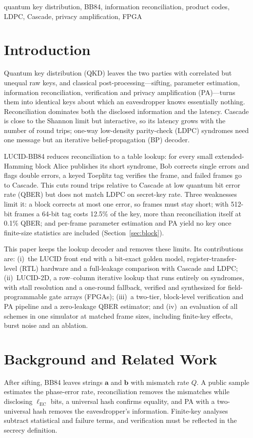 \documentclass[conference]{IEEEtran}
\begin{document}
\begin{IEEEkeywords}
quantum key distribution, BB84, information reconciliation, product codes, LDPC, Cascade, privacy amplification, FPGA
\end{IEEEkeywords}

\section{Introduction}
Quantum key distribution (QKD) leaves the two parties with correlated but unequal raw keys, and classical post-processing---sifting, parameter estimation, information reconciliation, verification and privacy amplification (PA)---turns them into identical keys about which an eavesdropper knows essentially nothing. Reconciliation dominates both the disclosed information and the latency. Cascade is close to the Shannon limit but interactive, so its latency grows with the number of round trips; one-way low-density parity-check (LDPC) syndromes need one message but an iterative belief-propagation (BP) decoder.

LUCID-BB84 reduces reconciliation to a table lookup: for every small extended-Hamming block Alice publishes its short syndrome, Bob corrects single errors and flags double errors, a keyed Toeplitz tag verifies the frame, and failed frames go to Cascade. This cuts round trips relative to Cascade at low quantum bit error rate (QBER) but does not match LDPC on secret-key rate. Three weaknesses limit it: a block corrects at most one error, so frames must stay short; with 512-bit frames a 64-bit tag costs 12.5\% of the key, more than reconciliation itself at 0.1\% QBER; and per-frame parameter estimation and PA yield no key once finite-size statistics are included (Section~\ref{sec:block}).

This paper keeps the lookup decoder and removes these limits. Its contributions are: (i)~the LUCID front end with a bit-exact golden model, register-transfer-level (RTL) hardware and a full-leakage comparison with Cascade and LDPC; (ii)~LUCID-2D, a row--column iterative lookup that runs entirely on syndromes, with stall resolution and a one-round fallback, verified and synthesized for field-programmable gate arrays (FPGAs); (iii)~a two-tier, block-level verification and PA pipeline and a zero-leakage QBER estimator; and (iv)~an evaluation of all schemes in one simulator at matched frame sizes, including finite-key effects, burst noise and an ablation.

\section{Background and Related Work}\label{sec:related}
After sifting, BB84 leaves strings $\mathbf{a}$ and $\mathbf{b}$ with mismatch rate $Q$. A public sample estimates the phase-error rate, reconciliation removes the mismatches while disclosing $\ell_{\mathrm{EC}}$ bits, a universal hash confirms equality, and PA with a two-universal hash removes the eavesdropper's information. Finite-key analyses subtract statistical and failure terms, and verification must be reflected in the secrecy definition.
\end{document}
